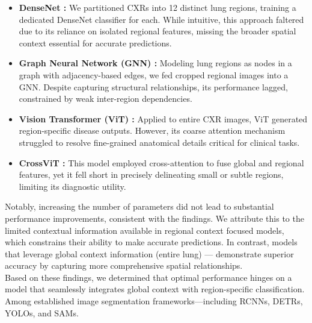 \documentclass[10pt,twocolumn,letterpaper]{article}
\begin{document}
\begin{itemize}
    \item \textbf{DenseNet \cite{1608.06993}:} We partitioned CXRs into 12 distinct lung regions, training a dedicated DenseNet classifier for each. While intuitive, this approach faltered due to its reliance on isolated regional features, missing the broader spatial context essential for accurate predictions.
    \item \textbf{Graph Neural Network (GNN) \cite{1812.08434}:} Modeling lung regions as nodes in a graph with adjacency-based edges, we fed cropped regional images into a GNN. Despite capturing structural relationships, its performance lagged, constrained by weak inter-region dependencies.
    \item \textbf{Vision Transformer (ViT) \cite{2010.11929}:} Applied to entire CXR images, ViT generated region-specific disease outputs. However, its coarse attention mechanism struggled to resolve fine-grained anatomical details critical for clinical tasks.
    \item \textbf{CrossViT \cite{2103.14899}:} This model employed cross-attention to fuse global and regional features, yet it fell short in precisely delineating small or subtle regions, limiting its diagnostic utility.
\end{itemize}

Notably, increasing the number of parameters did not lead to substantial performance improvements, consistent with the findings. We attribute this to the limited contextual information available in regional context focused models, which constrains their ability to make accurate predictions. In contrast, models that leverage global context information\cite{agu2021anaxnet} (entire lung) — demonstrate superior accuracy by capturing more comprehensive spatial relationships.\\

Based on these findings, we determined that optimal performance hinges on a model that seamlessly integrates global context with region-specific classification. Among established image segmentation frameworks—including RCNNs, DETRs, YOLOs, and SAMs. \\ 
\end{document}
